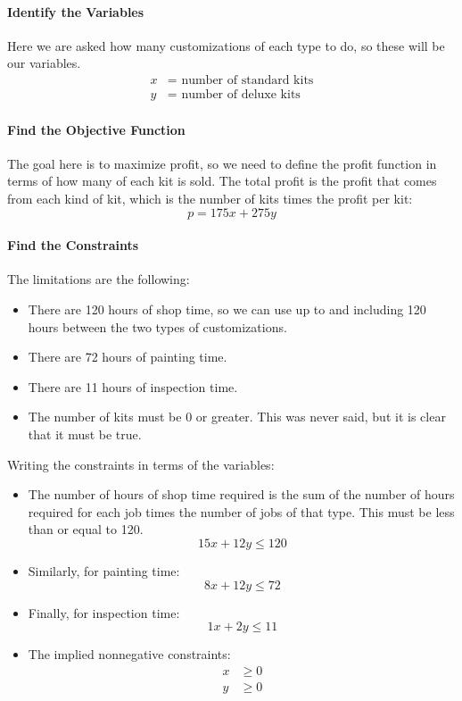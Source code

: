 \paragraph{Identify the Variables} Here we are asked how many customizations of each type to do, so these will be our variables.
\begin{align*}
x &= \textrm{ number of standard kits}\\
y &= \textrm{ number of deluxe kits}
\end{align*}

\paragraph{Find the Objective Function} The goal here is to maximize profit, so we need to define the profit function in terms of how many of each kit is sold.  The total profit is the profit that comes from each kind of kit, which is the number of kits times the profit per kit:
\[p=175x+275y\]

\paragraph{Find the Constraints} The limitations are the following:
\begin{itemize}
\item There are 120 hours of shop time, so we can use up to and including 120 hours between the two types of customizations.
\item There are 72 hours of painting time.
\item There are 11 hours of inspection time.
\item The number of kits must be 0 or greater.  This was never said, but it is clear that it must be true.
\end{itemize}
Writing the constraints in terms of the variables:
\begin{itemize}
\item The number of hours of shop time required is the sum of the number of hours required for each job times the number of jobs of that type.  This must be less than or equal to 120.
\[15x+12y \leq 120\]
\item Similarly, for painting time:
\[8x+12y \leq 72\]
\item Finally, for inspection time:
\[1x+2y \leq 11\]
\item The implied nonnegative constraints:
\begin{align*}
x &\geq 0\\
y &\geq 0
\end{align*}
\end{itemize}

